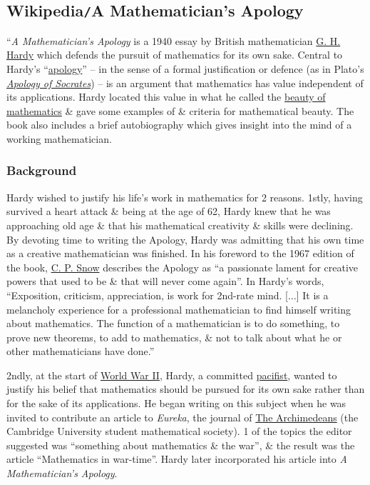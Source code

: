 \documentclass{article}
\begin{document}

\subsection{Wikipedia{\tt/}A Mathematician's Apology}
``{\it A Mathematician's Apology} \cite{Hardy1940,Hardy1992,Hardy2022} is a 1940 essay by British mathematician \href{https://en.wikipedia.org/wiki/G._H._Hardy}{\sc G. H. Hardy} which defends the pursuit of mathematics for its own sake. Central to {\sc Hardy}'s ``\href{https://en.wikipedia.org/wiki/Apologetics}{apology}'' -- in the sense of a formal justification or defence (as in {\sc Plato}'s \href{https://en.wikipedia.org/wiki/Apology_(Plato)}{\it Apology of Socrates}) -- is an argument that mathematics has value independent of its applications. {\sc Hardy} located this value in what he called the \href{https://en.wikipedia.org/wiki/Mathematical_beauty}{beauty of mathematics} \& gave some examples of \& criteria for mathematical beauty. The book also includes a brief autobiography which gives insight into the mind of a working mathematician.

\subsubsection{Background}
{\sc Hardy} wished to justify his life's work in mathematics for 2 reasons. 1stly, having survived a heart attack \& being at the age of 62, {\sc Hardy} knew that he was approaching old age \& that his mathematical creativity \& skills were declining. By devoting time to writing the Apology, {\sc Hardy} was admitting that his own time as a creative mathematician was finished. In his foreword to the 1967 edition of the book, \href{https://en.wikipedia.org/wiki/C._P._Snow}{\sc C. P. Snow} describes the Apology as ``a passionate lament for creative powers that used to be \& that will never come again''. In {\sc Hardy}'s words, ``Exposition, criticism, appreciation, is work for 2nd-rate mind. [$\ldots$] It is a melancholy experience for a professional mathematician to find himself writing about mathematics. The function of a mathematician is to do something, to prove new theorems, to add to mathematics, \& not to talk about what he or other mathematicians have done.''

2ndly, at the start of \href{https://en.wikipedia.org/wiki/World_War_II}{World War II}, {\sc Hardy}, a committed \href{https://en.wikipedia.org/wiki/Pacifist}{pacifist}, wanted to justify his belief that mathematics should be pursued for its own sake rather than for the sake of its applications. He began writing on this subject when he was invited to contribute an article to {\it Eureka}, the journal of \href{https://en.wikipedia.org/wiki/The_Archimedeans}{The Archimedeans} (the Cambridge University student mathematical society). 1 of the topics the editor suggested was ``something about mathematics \& the war'', \& the result was the article ``Mathematics in war-time''. {\sc Hardy} later incorporated his article into {\it A Mathematician's Apology}.
\end{document}
